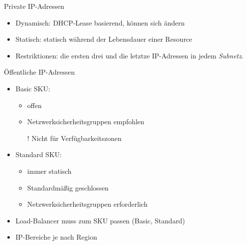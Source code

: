 

\begin{flashcard}[Definition]{Private IP-Adressen}
    \begin{itemize}
        \item Dynamisch: DHCP-Lease basierend, können sich ändern
        \item Statisch: statisch während der Lebensdauer einer Resource
        \item Restriktionen: die ersten drei und die letztze IP-Adressen in jedem \emph{Subnetz}.
    \end{itemize}
\end{flashcard}


\begin{flashcard}[Definition]{Öffentliche IP-Adressen}
    \begin{itemize}
        \item Basic SKU:
            \begin{itemize}
                \item offen
                \item Netzwerksicherheitsgruppen empfohlen
                \item[!] Nicht für Verfügbarkeitszonen
            \end{itemize}
        \item Standard SKU:
            \begin{itemize}
                \item immer statisch
                \item Standardmäßig geschlossen
                \item Netzwerksicherheitsgruppen erforderlich
            \end{itemize}
        \item Load-Balancer muss zum SKU passen (Basic, Standard)
        \item IP-Bereiche je nach Region
    \end{itemize}
\end{flashcard}

